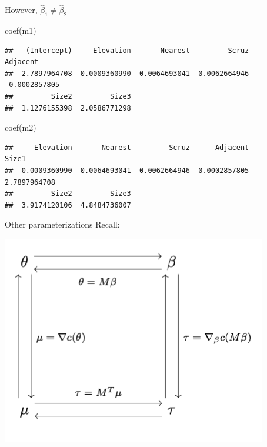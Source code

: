 \documentclass[
  ignorenonframetext,
]{beamer}
\newenvironment{Shaded}{\begin{snugshade}}{\end{snugshade}}
\newcommand{\FunctionTok}[1]{\textcolor[rgb]{0.00,0.00,0.00}{#1}}
\newcommand{\NormalTok}[1]{#1}
\begin{document}
\begin{frame}[fragile]{}
\protect\hypertarget{section-8}{}
However, \(\hat{\beta}_1 \neq \hat{\beta}_2\)

\vspace{12pt}
\tiny

\begin{Shaded}
\begin{Highlighting}[]
\FunctionTok{coef}\NormalTok{(m1)}
\end{Highlighting}
\end{Shaded}

\begin{verbatim}
##   (Intercept)     Elevation       Nearest         Scruz      Adjacent 
##  2.7897964708  0.0009360990  0.0064693041 -0.0062664946 -0.0002857805 
##         Size2         Size3 
##  1.1276155398  2.0586771298
\end{verbatim}

\begin{Shaded}
\begin{Highlighting}[]
\FunctionTok{coef}\NormalTok{(m2)}
\end{Highlighting}
\end{Shaded}

\begin{verbatim}
##     Elevation       Nearest         Scruz      Adjacent         Size1 
##  0.0009360990  0.0064693041 -0.0062664946 -0.0002857805  2.7897964708 
##         Size2         Size3 
##  3.9174120106  4.8484736007
\end{verbatim}
\end{frame}

\begin{frame}{Other parameterizations}
\protect\hypertarget{other-parameterizations}{}
Recall:

\includegraphics{transformations.png}
\end{frame}
\end{document}
